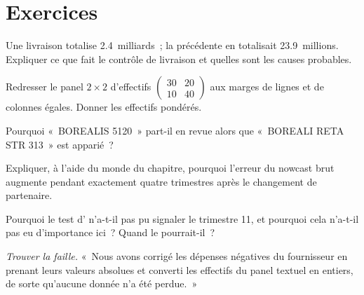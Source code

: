 \section{Exercices}

\begin{exercise}[$\star$]\label{exo:ml:alternative-data-pipelines:1}
Une livraison totalise 2.4~milliards~; la précédente en totalisait 23.9~millions. Expliquer ce que fait le contrôle de livraison et quelles sont les
causes probables.
\end{exercise}

\begin{exercise}[$\star$]\label{exo:ml:alternative-data-pipelines:2}
Redresser le panel $2\times2$ d'effectifs $\begin{pmatrix}30 & 20\\ 10 & 40\end{pmatrix}$ aux marges de lignes et de colonnes égales. Donner les
effectifs pondérés.
\end{exercise}

\begin{exercise}[$\star$]\label{exo:ml:alternative-data-pipelines:3}
Pourquoi «~BOREALIS 5120~» part-il en revue alors que «~BOREALI RETA STR 313~» est apparié~?
\end{exercise}

\begin{exercise}[$\star\star$]\label{exo:ml:alternative-data-pipelines:4}
Expliquer, à l'aide du monde du chapitre, pourquoi l'erreur du nowcast brut augmente pendant exactement quatre trimestres après le changement de partenaire.
\end{exercise}

\begin{exercise}[$\star\star$]\label{exo:ml:alternative-data-pipelines:5}
Pourquoi le test d' n'a-t-il pas pu signaler le trimestre 11, et pourquoi cela n'a-t-il pas eu d'importance ici~? Quand le pourrait-il~?
\end{exercise}

\begin{exercise}[$\star\star$]\label{exo:ml:alternative-data-pipelines:6}
\emph{Trouver la faille.} «~Nous avons corrigé les dépenses négatives du fournisseur en prenant leurs valeurs absolues et converti
les effectifs du panel textuel en entiers, de sorte qu'aucune donnée n'a été perdue.~»
\end{exercise}

